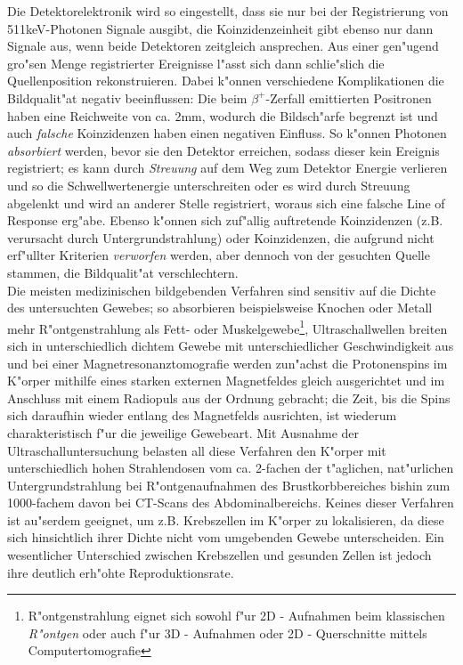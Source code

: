 \documentclass{article}
\begin{document}
Die Detektorelektronik wird so eingestellt, dass sie nur bei der Registrierung von 511keV-Photonen Signale ausgibt, die Koinzidenzeinheit gibt ebenso nur dann Signale aus, wenn beide Detektoren zeitgleich ansprechen. Aus einer gen"ugend gro"sen Menge registrierter Ereignisse l"asst sich dann schlie"slich die Quellenposition rekonstruieren. Dabei k"onnen verschiedene Komplikationen die Bildqualit"at negativ beeinflussen: Die beim $\beta^+$-Zerfall emittierten Positronen haben eine Reichweite von ca. 2mm, wodurch die Bildsch"arfe begrenzt ist und auch \textit{falsche} Koinzidenzen haben einen negativen Einfluss. So k"onnen Photonen \textit{absorbiert} werden, bevor sie den Detektor erreichen, sodass dieser kein Ereignis registriert; es kann durch \textit{Streuung} auf dem Weg zum Detektor Energie verlieren und so die Schwellwertenergie unterschreiten oder es wird durch Streuung abgelenkt und wird an anderer Stelle registriert, woraus sich eine falsche Line of Response erg"abe. Ebenso k"onnen sich zuf"allig auftretende Koinzidenzen (z.B. verursacht durch Untergrundstrahlung) oder Koinzidenzen, die aufgrund nicht erf"ullter Kriterien \textit{verworfen} werden, aber dennoch von der gesuchten Quelle stammen, die Bildqualit"at verschlechtern.\\
Die meisten medizinischen bildgebenden Verfahren sind sensitiv auf die Dichte des untersuchten Gewebes; so absorbieren beispielsweise Knochen oder Metall mehr R"ontgenstrahlung als Fett- oder Muskelgewebe\footnote{R"ontgenstrahlung eignet sich sowohl f"ur 2D - Aufnahmen beim klassischen \textit{R"ontgen} oder auch f"ur 3D - Aufnahmen oder 2D - Querschnitte mittels Computertomografie}, Ultraschallwellen breiten sich in unterschiedlich dichtem Gewebe mit unterschiedlicher Geschwindigkeit aus und bei einer Magnetresonanztomografie werden zun"achst die Protonenspins im K"orper mithilfe eines starken externen Magnetfeldes gleich ausgerichtet und im Anschluss mit einem Radiopuls aus der Ordnung gebracht; die Zeit, bis die Spins sich daraufhin wieder entlang des Magnetfelds ausrichten, ist wiederum charakteristisch f"ur die jeweilige Gewebeart. Mit Ausnahme der Ultraschalluntersuchung belasten all diese Verfahren den K"orper mit unterschiedlich hohen Strahlendosen vom ca. 2-fachen der t"aglichen, nat"urlichen Untergrundstrahlung bei R"ontgenaufnahmen des Brustkorbbereiches bishin zum 1000-fachem davon bei CT-Scans des Abdominalbereichs.  Keines dieser Verfahren ist au"serdem geeignet, um z.B. Krebszellen im K"orper zu lokalisieren, da diese sich hinsichtlich ihrer Dichte nicht vom umgebenden Gewebe unterscheiden. Ein wesentlicher Unterschied zwischen Krebszellen und gesunden Zellen ist jedoch ihre deutlich erh"ohte Reproduktionsrate.\\
\end{document}

